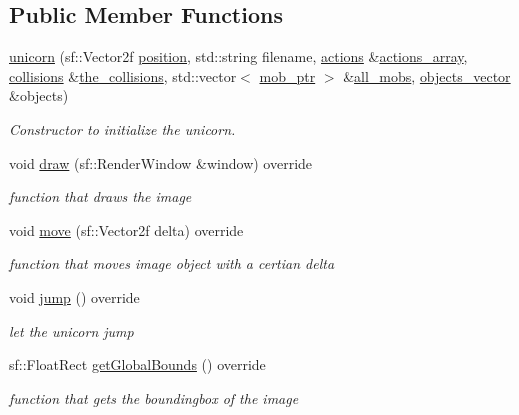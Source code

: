 \subsection*{Public Member Functions}
\begin{DoxyCompactItemize}
\item 
\hyperlink{classunicorn_a5106a69c85e9426caf0bc79f48c21ed4}{unicorn} (sf\+::\+Vector2f \hyperlink{classdrawable_a34679fa5ae82eee65dfd6b1b9f3c7cb6}{position}, std\+::string filename, \hyperlink{drawable_8hpp_a38f93e4749e0d65d51360c429766d212}{actions} \&\hyperlink{classunicorn_a1cc767e234ec6d55ca0b576747f8d7d7}{actions\+\_\+array}, \hyperlink{drawable_8hpp_a7e1a7f34f6d09dabb4cdafd6e4118603}{collisions} \&\hyperlink{classunicorn_a77b6bd58d4bd308c55a530c50fdcce41}{the\+\_\+collisions}, std\+::vector$<$ \hyperlink{npc_8hpp_a09ee7f853fc9bc830a9445a06fd53d4b}{mob\+\_\+ptr} $>$ \&\hyperlink{classunicorn_aac73bd105ef4ee4c7d46727a7e832bcf}{all\+\_\+mobs}, \hyperlink{drawable_8hpp_a6c0fdb1dfd0c34dbbdbb5dcd3c608b07}{objects\+\_\+vector} \&objects)
\begin{DoxyCompactList}\small\item\em Constructor to initialize the unicorn. \end{DoxyCompactList}\item 
void \hyperlink{classunicorn_a570c34d5669a8d2a61bdc1481e6f9dee}{draw} (sf\+::\+Render\+Window \&window) override
\begin{DoxyCompactList}\small\item\em function that draws the image \end{DoxyCompactList}\item 
void \hyperlink{classunicorn_a162f200a68342f7bc0baaf17c8cf3f9f}{move} (sf\+::\+Vector2f delta) override
\begin{DoxyCompactList}\small\item\em function that moves image object with a certian delta \end{DoxyCompactList}\item 
void \hyperlink{classunicorn_a07d5ca4e66632c0e871221a27146805a}{jump} () override
\begin{DoxyCompactList}\small\item\em let the unicorn jump \end{DoxyCompactList}\item 
sf\+::\+Float\+Rect \hyperlink{classunicorn_a1bac09fc59b04f14f5a093bc4daa04da}{get\+Global\+Bounds} () override
\begin{DoxyCompactList}\small\item\em function that gets the boundingbox of the image \end{DoxyCompactList}\item 

\end{DoxyCompactItemize}
